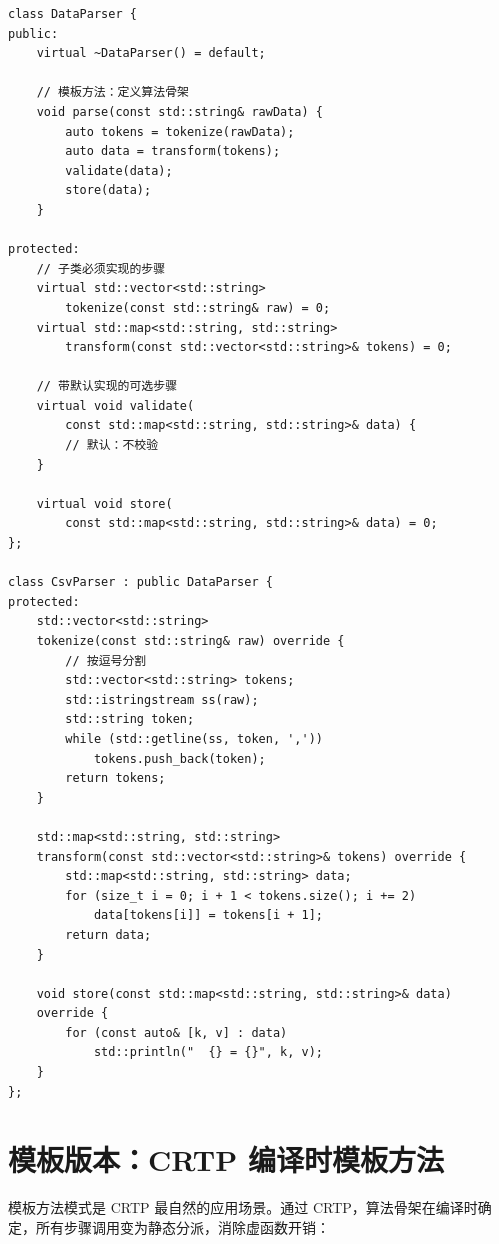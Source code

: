 \documentclass[12pt,a4paper,fontset=fandol]{ctexbook}
\begin{document}
\begin{lstlisting}[style=cppstyle, caption={模板方法模式 --- 数据解析器}]
class DataParser {
public:
    virtual ~DataParser() = default;

    // 模板方法：定义算法骨架
    void parse(const std::string& rawData) {
        auto tokens = tokenize(rawData);
        auto data = transform(tokens);
        validate(data);
        store(data);
    }

protected:
    // 子类必须实现的步骤
    virtual std::vector<std::string>
        tokenize(const std::string& raw) = 0;
    virtual std::map<std::string, std::string>
        transform(const std::vector<std::string>& tokens) = 0;

    // 带默认实现的可选步骤
    virtual void validate(
        const std::map<std::string, std::string>& data) {
        // 默认：不校验
    }

    virtual void store(
        const std::map<std::string, std::string>& data) = 0;
};

class CsvParser : public DataParser {
protected:
    std::vector<std::string>
    tokenize(const std::string& raw) override {
        // 按逗号分割
        std::vector<std::string> tokens;
        std::istringstream ss(raw);
        std::string token;
        while (std::getline(ss, token, ','))
            tokens.push_back(token);
        return tokens;
    }

    std::map<std::string, std::string>
    transform(const std::vector<std::string>& tokens) override {
        std::map<std::string, std::string> data;
        for (size_t i = 0; i + 1 < tokens.size(); i += 2)
            data[tokens[i]] = tokens[i + 1];
        return data;
    }

    void store(const std::map<std::string, std::string>& data)
    override {
        for (const auto& [k, v] : data)
            std::println("  {} = {}", k, v);
    }
};
\end{lstlisting}

\section{模板版本：CRTP 编译时模板方法}

模板方法模式是 CRTP 最自然的应用场景。通过 CRTP，算法骨架在编译时确定，所有步骤调用变为静态分派，消除虚函数开销：
\end{document}
